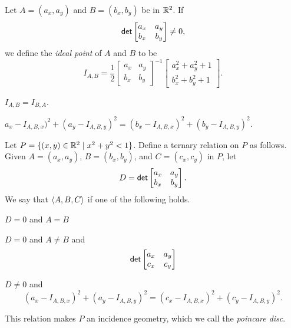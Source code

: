 Let \(A = (a_x, a_y)\) and \(B = (b_x, b_y)\) be in \(\mathbb{R}^2\).
If \[ \mathsf{det} \begin{bmatrix} a_x & a_y \\ b_x & b_y \end{bmatrix} \neq 0, \] we define the \emph{ideal point} of \(A\) and \(B\) to be \[ I_{A,B} = \frac{1}{2} \begin{bmatrix} a_x & a_y \\ b_x & b_y \end{bmatrix}^{-1} \begin{bmatrix} a_x^2 + a_y^2 + 1 \\ b_x^2 + b_y^2 + 1 \end{bmatrix}. \]

\begin{prop}\mbox{}
\begin{proplist}
\item \(I_{A,B} = I_{B,A}\).
\item \(a_x - I_{A,B,x})^2 + (a_y - I_{A,B,y})^2 = (b_x - I_{A,B,x})^2 + (b_y - I_{A,B,y})^2\).
\end{proplist}
\end{prop}

\begin{prop}
Let \(P = \{ (x,y) \in \mathbb{R}^2 \mid x^2 + y^2 < 1 \}\).
Define a ternary relation on \(P\) as follows.
Given \(A = (a_x,a_y)\), \(B = (b_x, b_y)\), and \(C = (c_x, c_y)\) in \(P\), let \[ D = \mathsf{det} \begin{bmatrix} a_x & a_y \\ b_x & b_y \end{bmatrix}. \]
We say that \(\langle A, B, C \rangle\) if one of the following holds.
\begin{proplist}
\item \(D = 0\) and \(A = B\)
\item \(D = 0\) and \(A \neq B\) and \[ \mathsf{det} \begin{bmatrix} a_x & a_y \\ c_x & c_y \end{bmatrix} \]
\item \(D \neq 0\) and \[ (a_x - I_{A,B,x})^2 + (a_y - I_{A,B,y})^2 = (c_x - I_{A,B,x})^2 + (c_y - I_{A,B,y})^2. \]
\end{proplist}
This relation makes \(P\) an incidence geometry, which we call the \emph{poincare disc}.
\end{prop}
